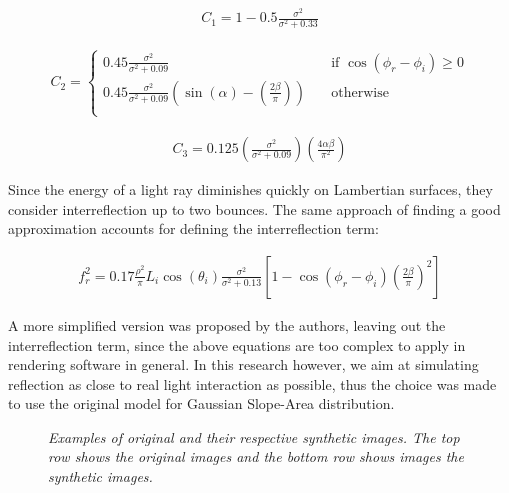 	\begin{eqnarray*}
		C_1 = 1 - 0.5\frac{\sigma^2}{\sigma^2+0.33}
	\end{eqnarray*}

	\begin{eqnarray*}
		C_2 =
			\begin{cases}
				0.45\frac{\sigma^2}{\sigma^2+0.09} 		& \quad \text{if $\cos(\phi_r - \phi_i) \geq 0$}\\
				0.45\frac{\sigma^2}{\sigma^2+0.09} \left( \sin(\alpha) - \left( \frac{2\beta}{\pi}\right)\right) 	& \quad \text{otherwise}\\
			\end{cases}
	\end{eqnarray*}

	\begin{eqnarray*}
		C_3 = 0.125 \left( \frac{\sigma^2}{\sigma^2+0.09} \right)\left( \frac{4\alpha\beta}{\pi^2} \right)
	\end{eqnarray*}

\noindent Since the energy of a light ray diminishes quickly on Lambertian surfaces, they consider interreflection up to two bounces. The same approach of finding a good approximation accounts for defining the interreflection term:

	\begin{eqnarray*}
		f_r^2 = 0.17\frac{\rho^2}{\pi}L_i\cos(\theta_i)\frac{\sigma^2}{\sigma^2+0.13}\left[1-\cos(\phi_r-\phi_i)\left( \frac{2\beta}{\pi} \right)^2 \right]
	\end{eqnarray*}

\noindent A more simplified version was proposed by the authors, leaving out the interreflection term, since the above equations are too complex to apply in rendering software in general. In this research however, we aim at simulating reflection as close to real light interaction as possible, thus the choice was made to use the original model for Gaussian Slope-Area distribution.

\begin{figure}[htbp!]
	\begin{center}

		\label{fig:acd1}
		\label{fig:aab1}
	\end{center}
	\caption{{\it Examples of original and their respective synthetic images. The top row shows the original images and the bottom row shows images the synthetic images.}}
	\label{fig:RenderExamples2}
\end{figure}

